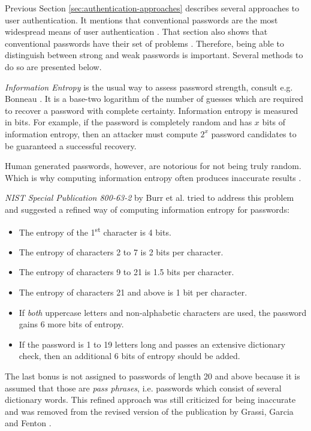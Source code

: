 Previous Section \ref{sec:authentication-approaches} describes several approaches to user authentication. It mentions that conventional passwords are the most widespread means of user authentication \cite{bonneau:2015:passwords-and-evolution-of-auth}. That section also shows that conventional passwords have their set of problems \cite{yan:2004:password, braz:2006:security, jobusch:1989:survey-of-password-mechanisms-1, jobusch:1989:survey-of-password-mechanisms-2}. Therefore, being able to distinguish between strong and weak passwords is important. Several methods to do so are presented below.

\emph{Information Entropy} is the usual way to assess password strength, consult e.g. Bonneau \cite{bonneau:2012:the-science-of-guessing}. It is a base-two logarithm of the number of guesses which are required to recover a password with complete certainty. Information entropy is measured in bits. For example, if the password is completely random and has \(x\) bits of information entropy, then an attacker must compute \(2^x\) password candidates to be guaranteed a successful recovery.

Human generated passwords, however, are notorious for not being truly random. Which is why computing information entropy often produces inaccurate results \cite{bonneau:2012:the-science-of-guessing}.

\emph{NIST Special Publication 800-63-2} by Burr et al. \cite{burr2013electronic} tried to address this problem and suggested a refined way of computing information entropy for passwords:

\begin{itemize}
    \item The entropy of the 1\textsuperscript{st} character is 4 bits.
    \item The entropy of characters 2 to 7 is 2 bits per character.
    \item The entropy of characters 9 to 21 is 1.5 bits per character.
    \item The entropy of characters 21 and above is 1 bit per character.
    \item If \emph{both} uppercase letters and non-alphabetic characters are used, the password gains 6 more bits of entropy.
    \item If the password is 1 to 19 letters long and passes an extensive dictionary check, then an additional 6 bits of entropy should be added.
  \end{itemize}

The last bonus is not assigned to passwords of length 20 and above because it is assumed that those are \emph{pass phrases}, i.e. passwords which consist of several dictionary words. This refined approach was still criticized for being inaccurate and was removed from the revised version of the publication by Grassi, Garcia and Fenton \cite{grassi2017digital}.

